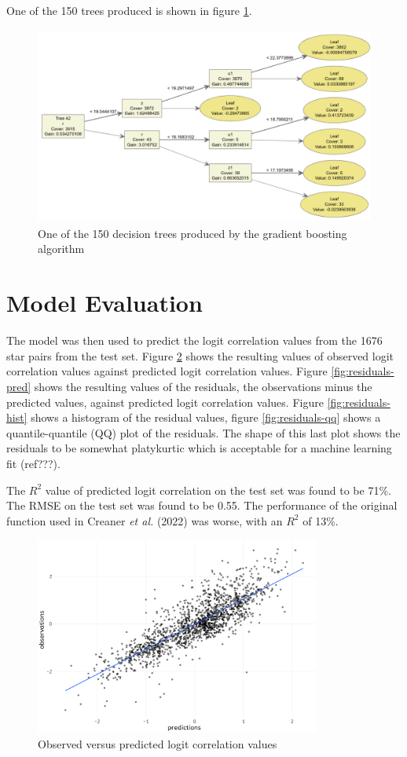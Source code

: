 \documentclass[a4paper,fleqn,usenatbib]{mnras}
\begin{document}
One of the 150 trees produced is shown in figure \ref{fig:tree}.

\begin{figure}
  \includegraphics[width=\columnwidth, height = 6.5cm]{figures/tree}
    \caption{One of the 150 decision trees produced by the gradient boosting algorithm}
    \label{fig:tree}
\end{figure}

\hypertarget{model-evaluation}{%
\section{Model Evaluation}\label{model-evaluation}}

The model was then used to predict the logit correlation values from the
1676 star pairs from the test set. Figure \ref{fig:obs-pred} shows the
resulting values of observed logit correlation values against predicted
logit correlation values. Figure \ref{fig:residuals-pred} shows the
resulting values of the residuals, the observations minus the predicted
values, against predicted logit correlation values. Figure
\ref{fig:residuals-hist} shows a histogram of the residual values,
figure \ref{fig:residuals-qq} shows a quantile-quantile (QQ) plot of the
residuals. The shape of this last plot shows the residuals to be
somewhat platykurtic which is acceptable for a machine learning fit
(ref???).

The \(R^2\) value of predicted logit correlation on the test set was
found to be 71\%. The RMSE on the test set was found to be 0.55. The
performance of the original function used in Creaner \emph{et al.}
(2022) was worse, with an \(R^2\) of 13\%.

\begin{figure}
  \includegraphics[width=\columnwidth, height = 6.5cm]{figures/observed-predicted}
    \caption{Observed versus predicted logit correlation values}
    \label{fig:obs-pred}
\end{figure}
\end{document}
